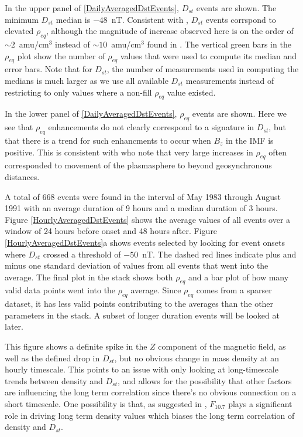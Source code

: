\documentclass[10pt,twocolumn]{article}
\begin{document}
In the upper panel of \ref{DailyAveragedDstEvents}, $D_{st}$ events are shown.  The minimum $D_{st}$ median is $-48$~nT.  Consistent with \cite{Takahashi2010}, $D_{st}$ events corrspond to elevated $\rho_{eq}$, although the magnitude of increase observed here is on the order of $\sim2$~amu/cm$^3$ instead of $\sim10$~amu/cm$^3$ found in \cite{Takahashi2010}.  The vertical green bars in the $\rho_{eq}$ plot show the number of $\rho_{eq}$ values that were used to compute its median and error bars.  Note that for $D_{st}$, the number of measurements used in computing the medians is much larger as we use all available $D_{st}$ measurements instead of restricting to only values where a non-fill $\rho_{eq}$ value existed.  

In the lower panel of \ref{DailyAveragedDstEvents}, $\rho_{eq}$ events are shown.  Here we see that $\rho_{eq}$ enhancements do not clearly correspond to a signature in $D_{st}$, but that there is a trend for such enhancments to occur when $B_{z}$ in the IMF is positive.  This is consistent with \cite{Takahashi2010} who note that very large increases in $\rho_{eq}$ often corresponded to movement of the plasmasphere to beyond geosynchronous distances. 

A total of 668 events were found in the interval of May 1983 through August 1991 with an average duration of 9 hours and a median duration of 3 hours. Figure \ref{HourlyAveragedDstEvents} shows the average values of all events over a window of 24 hours before onset and 48 hours after. Figure \ref{HourlyAveragedDstEvents}a shows events selected by looking for event onsets where $D_{st}$ crossed a threshold of $-50$~nT. The dashed red lines indicate plus and minus one standard deviation of values from all events that went into the average. The final plot in the stack shows both $\rho_{eq}$ and a bar plot of how many valid data points went into the $\rho_{eq}$ average. Since $\rho_{eq}$ comes from a sparser dataset, it has less valid points contributing to the averages than the other parameters in the stack. A subset of longer duration events will be looked at later. 

This figure shows a definite spike in the $Z$ component of the magnetic field, as well as the defined drop in $D_{st}$, but no obvious change in mass density at an hourly timescale. This points to an issue with only looking at long-timescale trends between density and $D_{st}$, and allows for the possibility that other factors are influencing the long term correlation since there's no obvious connection on a short timescale. One possibility is that, as suggested in \cite{Takahashi2010}, $F_{10.7}$ plays a significant role in driving long term density values which biases the long term correlation of density and $D_{st}$.
\end{document}
